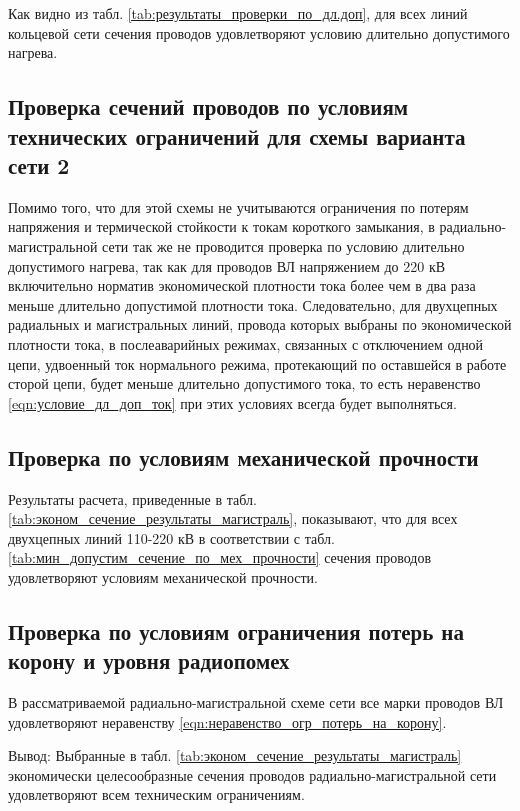 Как видно из табл. \ref{tab:результаты_проверки_по_дл.доп}, для всех линий кольцевой сети сечения проводов удовлетворяют условию длительно допустимого нагрева.

\subsection{Проверка сечений проводов по условиям технических ограничений для схемы варианта сети 2}

Помимо того, что для этой схемы не учитываются ограничения по потерям напряжения и термической стойкости к токам короткого замыкания, в радиально-магистральной сети так же не проводится проверка по условию длительно допустимого нагрева, так как для проводов ВЛ напряжением до 220 кВ включительно норматив экономической плотности тока более чем в два раза меньше длительно допустимой плотности тока. Следовательно, для двухцепных радиальных и магистральных линий, провода которых выбраны по экономической плотности тока, в послеаварийных режимах, связанных с отключением одной цепи, удвоенный ток нормального режима, протекающий по оставшейся в работе сторой цепи, будет меньше длительно допустимого тока, то есть неравенство \eqref{eqn:условие_дл_доп_ток} при этих условиях всегда будет выполняться.

\subsection*{Проверка по условиям механической прочности}

Результаты расчета, приведенные в табл. \ref{tab:эконом_сечение_результаты_магистраль}, показывают, что для всех двухцепных линий 110-220 кВ в соответствии с табл. \ref{tab:мин_допустим_сечение_по_мех_прочности} сечения проводов удовлетворяют условиям механической прочности.

\subsection*{Проверка по условиям ограничения потерь на корону и уровня радиопомех}

В рассматриваемой радиально-магистральной схеме сети все марки проводов ВЛ удовлетворяют неравенству \eqref{eqn:неравенство_огр_потерь_на_корону}.

Вывод: Выбранные в табл. \ref{tab:эконом_сечение_результаты_магистраль} экономически целесообразные сечения проводов радиально-магистральной сети удовлетворяют всем техническим ограничениям.

